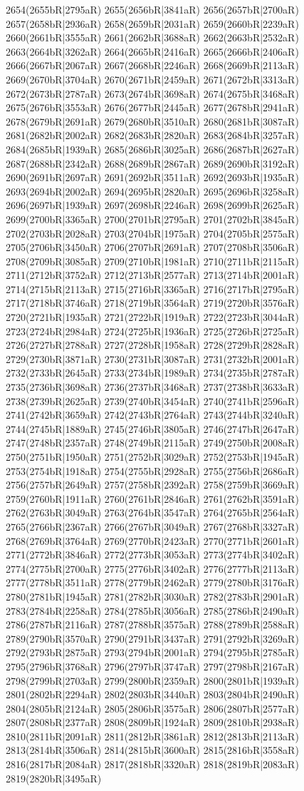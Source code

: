 2654(2655bR|2795aR) 2655(2656bR|3841aR) 2656(2657bR|2700aR) 2657(2658bR|2936aR) 2658(2659bR|2031aR) 2659(2660bR|2239aR) 2660(2661bR|3555aR) 2661(2662bR|3688aR) 2662(2663bR|2532aR) 2663(2664bR|3262aR) 2664(2665bR|2416aR) 2665(2666bR|2406aR) 2666(2667bR|2067aR) 2667(2668bR|2246aR) 2668(2669bR|2113aR) 2669(2670bR|3704aR) 2670(2671bR|2459aR) 2671(2672bR|3313aR) 2672(2673bR|2787aR) 2673(2674bR|3698aR) 2674(2675bR|3468aR) 2675(2676bR|3553aR) 2676(2677bR|2445aR) 2677(2678bR|2941aR) 2678(2679bR|2691aR) 2679(2680bR|3510aR) 2680(2681bR|3087aR) 2681(2682bR|2002aR) 2682(2683bR|2820aR) 2683(2684bR|3257aR) 2684(2685bR|1939aR) 2685(2686bR|3025aR) 2686(2687bR|2627aR) 2687(2688bR|2342aR) 2688(2689bR|2867aR) 2689(2690bR|3192aR) 2690(2691bR|2697aR) 2691(2692bR|3511aR) 2692(2693bR|1935aR) 2693(2694bR|2002aR) 2694(2695bR|2820aR) 2695(2696bR|3258aR) 2696(2697bR|1939aR) 2697(2698bR|2246aR) 2698(2699bR|2625aR) 2699(2700bR|3365aR) 2700(2701bR|2795aR) 2701(2702bR|3845aR) 2702(2703bR|2028aR) 2703(2704bR|1975aR) 2704(2705bR|2575aR) 2705(2706bR|3450aR) 2706(2707bR|2691aR) 2707(2708bR|3506aR) 2708(2709bR|3085aR) 2709(2710bR|1981aR) 2710(2711bR|2115aR) 2711(2712bR|3752aR) 2712(2713bR|2577aR) 2713(2714bR|2001aR) 2714(2715bR|2113aR) 2715(2716bR|3365aR) 2716(2717bR|2795aR) 2717(2718bR|3746aR) 2718(2719bR|3564aR) 2719(2720bR|3576aR) 2720(2721bR|1935aR) 2721(2722bR|1919aR) 2722(2723bR|3044aR) 2723(2724bR|2984aR) 2724(2725bR|1936aR) 2725(2726bR|2725aR) 2726(2727bR|2788aR) 2727(2728bR|1958aR) 2728(2729bR|2828aR) 2729(2730bR|3871aR) 2730(2731bR|3087aR) 2731(2732bR|2001aR) 2732(2733bR|2645aR) 2733(2734bR|1989aR) 2734(2735bR|2787aR) 2735(2736bR|3698aR) 2736(2737bR|3468aR) 2737(2738bR|3633aR) 2738(2739bR|2625aR) 2739(2740bR|3454aR) 2740(2741bR|2596aR) 2741(2742bR|3659aR) 2742(2743bR|2764aR) 2743(2744bR|3240aR) 2744(2745bR|1889aR) 2745(2746bR|3805aR) 2746(2747bR|2647aR) 2747(2748bR|2357aR) 2748(2749bR|2115aR) 2749(2750bR|2008aR) 2750(2751bR|1950aR) 2751(2752bR|3029aR) 2752(2753bR|1945aR) 2753(2754bR|1918aR) 2754(2755bR|2928aR) 2755(2756bR|2686aR) 2756(2757bR|2649aR) 2757(2758bR|2392aR) 2758(2759bR|3669aR) 2759(2760bR|1911aR) 2760(2761bR|2846aR) 2761(2762bR|3591aR) 2762(2763bR|3049aR) 2763(2764bR|3547aR) 2764(2765bR|2564aR) 2765(2766bR|2367aR) 2766(2767bR|3049aR) 2767(2768bR|3327aR) 2768(2769bR|3764aR) 2769(2770bR|2423aR) 2770(2771bR|2601aR) 2771(2772bR|3846aR) 2772(2773bR|3053aR) 2773(2774bR|3402aR) 2774(2775bR|2700aR) 2775(2776bR|3402aR) 2776(2777bR|2113aR) 2777(2778bR|3511aR) 2778(2779bR|2462aR) 2779(2780bR|3176aR) 2780(2781bR|1945aR) 2781(2782bR|3030aR) 2782(2783bR|2901aR) 2783(2784bR|2258aR) 2784(2785bR|3056aR) 2785(2786bR|2490aR) 2786(2787bR|2116aR) 2787(2788bR|3575aR) 2788(2789bR|2588aR) 2789(2790bR|3570aR) 2790(2791bR|3437aR) 2791(2792bR|3269aR) 2792(2793bR|2875aR) 2793(2794bR|2001aR) 2794(2795bR|2785aR) 2795(2796bR|3768aR) 2796(2797bR|3747aR) 2797(2798bR|2167aR) 2798(2799bR|2703aR) 2799(2800bR|2359aR) 2800(2801bR|1939aR) 2801(2802bR|2294aR) 2802(2803bR|3440aR) 2803(2804bR|2490aR) 2804(2805bR|2124aR) 2805(2806bR|3575aR) 2806(2807bR|2577aR) 2807(2808bR|2377aR) 2808(2809bR|1924aR) 2809(2810bR|2938aR) 2810(2811bR|2091aR) 2811(2812bR|3861aR) 2812(2813bR|2113aR) 2813(2814bR|3506aR) 2814(2815bR|3600aR) 2815(2816bR|3558aR) 2816(2817bR|2084aR) 2817(2818bR|3320aR) 2818(2819bR|2083aR) 2819(2820bR|3495aR) 